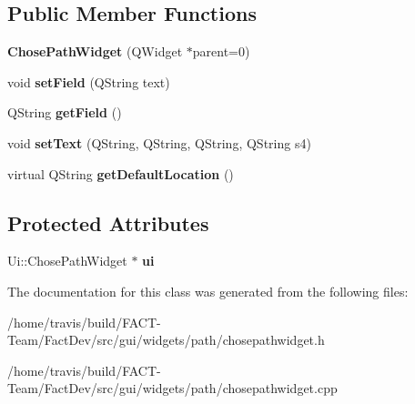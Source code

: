 \subsection*{Public Member Functions}
\begin{DoxyCompactItemize}
\item 
\hypertarget{classGui_1_1Widgets_1_1Path_1_1ChosePathWidget_a978d2251c213ff092767e83912924649}{{\bfseries Chose\-Path\-Widget} (Q\-Widget $\ast$parent=0)}\label{classGui_1_1Widgets_1_1Path_1_1ChosePathWidget_a978d2251c213ff092767e83912924649}

\item 
\hypertarget{classGui_1_1Widgets_1_1Path_1_1ChosePathWidget_adc6f1687854a9ace6fa82a3200b49f84}{void {\bfseries set\-Field} (Q\-String text)}\label{classGui_1_1Widgets_1_1Path_1_1ChosePathWidget_adc6f1687854a9ace6fa82a3200b49f84}

\item 
\hypertarget{classGui_1_1Widgets_1_1Path_1_1ChosePathWidget_ab36def0231e202c317914e19e023b244}{Q\-String {\bfseries get\-Field} ()}\label{classGui_1_1Widgets_1_1Path_1_1ChosePathWidget_ab36def0231e202c317914e19e023b244}

\item 
\hypertarget{classGui_1_1Widgets_1_1Path_1_1ChosePathWidget_accd4de906d989693423ac533f7a47566}{void {\bfseries set\-Text} (Q\-String, Q\-String, Q\-String, Q\-String s4)}\label{classGui_1_1Widgets_1_1Path_1_1ChosePathWidget_accd4de906d989693423ac533f7a47566}

\item 
\hypertarget{classGui_1_1Widgets_1_1Path_1_1ChosePathWidget_aa597dbc1297f0e85605a1859b64a799e}{virtual Q\-String {\bfseries get\-Default\-Location} ()}\label{classGui_1_1Widgets_1_1Path_1_1ChosePathWidget_aa597dbc1297f0e85605a1859b64a799e}

\end{DoxyCompactItemize}
\subsection*{Protected Attributes}
\begin{DoxyCompactItemize}
\item 
\hypertarget{classGui_1_1Widgets_1_1Path_1_1ChosePathWidget_a7d72a7018a2641bdfd2056b4b2431ef4}{Ui\-::\-Chose\-Path\-Widget $\ast$ {\bfseries ui}}\label{classGui_1_1Widgets_1_1Path_1_1ChosePathWidget_a7d72a7018a2641bdfd2056b4b2431ef4}

\end{DoxyCompactItemize}


The documentation for this class was generated from the following files\-:\begin{DoxyCompactItemize}
\item 
/home/travis/build/\-F\-A\-C\-T-\/\-Team/\-Fact\-Dev/src/gui/widgets/path/chosepathwidget.\-h\item 
/home/travis/build/\-F\-A\-C\-T-\/\-Team/\-Fact\-Dev/src/gui/widgets/path/chosepathwidget.\-cpp\end{DoxyCompactItemize}
